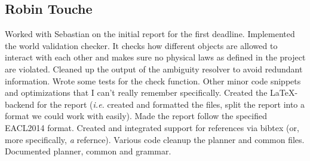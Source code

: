 \subsection*{Robin Touche}
Worked with Sebastian on the initial report for the first deadline.
\newline
\newline
Implemented the world validation checker.
It checks how different objects are allowed to interact with each other and makes sure no physical laws as defined in the project are violated.
Cleaned up the output of the ambiguity resolver to avoid redundant information.
Wrote some tests for the check function.
Other minor code snippets and optimizations that I can't really remember specifically.
\newline
\newline
Created the \LaTeX-backend for the report (\emph{i.e.} created and formatted the files, split the report into a format we could work with easily).
Made the report follow the specified EACL2014 format.
Created and integrated support for references via bibtex (or, more specifically, \emph{a} refernce).
\newline
\newline
Various code cleanup the planner and common files.
Documented planner, common and grammar.
